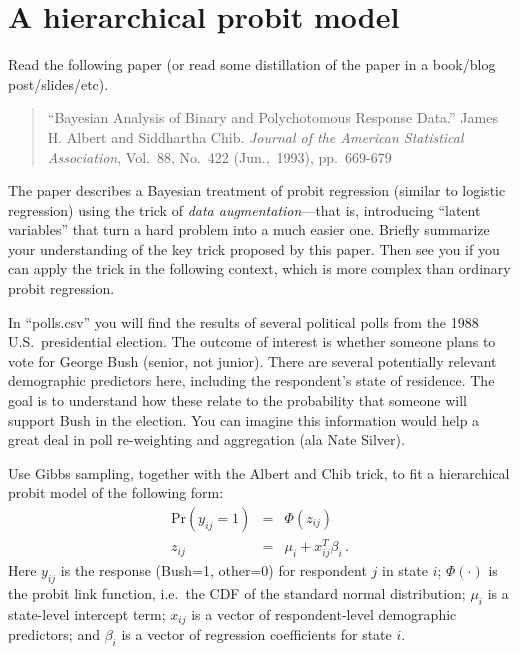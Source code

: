 \documentclass[11pt]{article}
\begin{document}
\clearpage \newpage
\section{A hierarchical probit model}

Read the following paper (or read some distillation of the paper in a book/blog post/slides/etc).  
\begin{quotation}
``Bayesian Analysis of Binary and Polychotomous Response Data.''  James H. Albert and Siddhartha Chib.  \textit{Journal of the American Statistical Association}, Vol.~88, No.~422 (Jun.,~1993), pp.~669-679
\end{quotation}

The paper describes a Bayesian treatment of probit regression (similar to logistic regression) using the trick of \textit{data augmentation}---that is, introducing ``latent variables'' that turn a hard problem into a much easier one.  Briefly summarize your understanding of the key trick proposed by this paper.  Then see you if you can apply the trick in the following context, which is more complex than ordinary probit regression.

In ``polls.csv'' you will find the results of several political polls from the 1988 U.S.~presidential election.  The outcome of interest is whether someone plans to vote for George Bush (senior, not junior).  There are several potentially relevant demographic predictors here, including the respondent's state of residence.  The goal is to understand how these relate to the probability that someone will support Bush in the election.  You can imagine this information would help a great deal in poll re-weighting and aggregation (ala Nate Silver).

Use Gibbs sampling, together with the Albert and Chib trick, to fit a hierarchical probit model of the following form:
\begin{eqnarray*}
\mbox{Pr}(y_{ij} = 1) &=& \Phi(z_{ij})  \\
z_{ij} &=& \mu_i + x_{ij}^T \beta_i \, .
\end{eqnarray*}
Here $y_{ij}$ is the response (Bush=1, other=0) for respondent $j$ in state $i$; $\Phi(\cdot)$ is the probit link function, i.e.~the CDF of the standard normal distribution; $\mu_i$ is a state-level intercept term; $x_{ij}$ is a vector of respondent-level demographic predictors; and $\beta_i$ is a vector of regression coefficients for state $i$.
\end{document}
